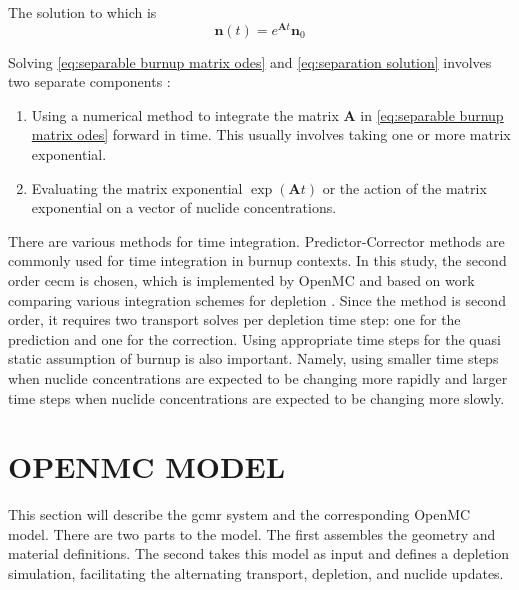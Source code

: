\documentclass[letterpaper]{physor2024}
\begin{document}
\noindent The solution to which is
\begin{equation} \label{eq:separation solution}
     \textbf{n}(t) = e^{\textbf{A}t} \textbf{n}_{0}
\end{equation}

\noindent Solving \cref{eq:separable burnup matrix odes} and \cref{eq:separation solution} involves two separate components \cite{romano-depletion-2021}:
\begin{enumerate}
    \item Using a numerical method to integrate the matrix $\textbf{A}$ in \cref{eq:separable burnup matrix odes} forward in time. This usually involves taking one or more matrix exponential.
    \item Evaluating the matrix exponential $\exp(\textbf{A}t)$ or the action of the matrix exponential on a vector of nuclide concentrations.
\end{enumerate}

There are various methods for time integration. Predictor-Corrector methods are commonly used for time integration in burnup contexts. In this study, the second order \gls{cecm} is chosen, which is implemented by OpenMC and based on work comparing various integration schemes for depletion \cite{isotalo_comparison_2015}. Since the method is second order, it requires two transport solves per depletion time step: one for the prediction and one for the correction. Using appropriate time steps for the quasi static assumption of burnup is also important. Namely, using smaller time steps when nuclide concentrations are expected to be changing more rapidly and larger time steps when nuclide concentrations are expected to be changing more slowly.

\section{OPENMC MODEL}\label{sec:openmc_model}
This section will describe the \gls{gcmr} system and the corresponding OpenMC model. There are two parts to the model. The first assembles the geometry and material definitions. The second takes this model as input and defines a depletion simulation, facilitating the alternating transport, depletion, and nuclide updates.
\end{document}
